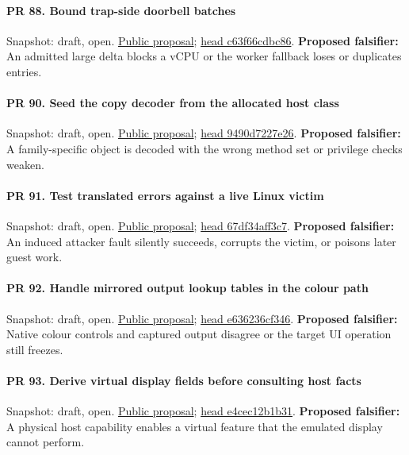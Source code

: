 \paragraph{PR 88. Bound trap-side doorbell batches}
\readcode Snapshot: draft, open.
\href{\repobase/pull/88}{Public proposal};
\href{\repobase/commit/c63f66cdbc8633dece1b27d3bfc962f358154fbf}{head c63f66cdbc86}.
\textbf{Proposed falsifier:} An admitted large delta blocks a vCPU or the worker fallback loses or
  duplicates entries.

\paragraph{PR 90. Seed the copy decoder from the allocated host class}
\readcode Snapshot: draft, open.
\href{\repobase/pull/90}{Public proposal};
\href{\repobase/commit/9490d7227e26dc0f5c9c618530ece0c39437cb77}{head 9490d7227e26}.
\textbf{Proposed falsifier:} A family-specific object is decoded with the wrong method set or
  privilege checks weaken.

\paragraph{PR 91. Test translated errors against a live Linux victim}
\readcode Snapshot: draft, open.
\href{\repobase/pull/91}{Public proposal};
\href{\repobase/commit/67df34aff3c7d24e8ba7c2cb9228d63105972b65}{head 67df34aff3c7}.
\textbf{Proposed falsifier:} An induced attacker fault silently succeeds, corrupts the victim, or
  poisons later guest work.

\paragraph{PR 92. Handle mirrored output lookup tables in the colour path}
\readcode Snapshot: draft, open.
\href{\repobase/pull/92}{Public proposal};
\href{\repobase/commit/e636236cf34621b0c9e53170638c54a55a22f979}{head e636236cf346}.
\textbf{Proposed falsifier:} Native colour controls and captured output disagree or the target UI
  operation still freezes.

\paragraph{PR 93. Derive virtual display fields before consulting host facts}
\readcode Snapshot: draft, open.
\href{\repobase/pull/93}{Public proposal};
\href{\repobase/commit/e4cec12b1b31864dfa94b0fca0c1aebbf1726e61}{head e4cec12b1b31}.
\textbf{Proposed falsifier:} A physical host capability enables a virtual feature that the emulated
  display cannot perform.

